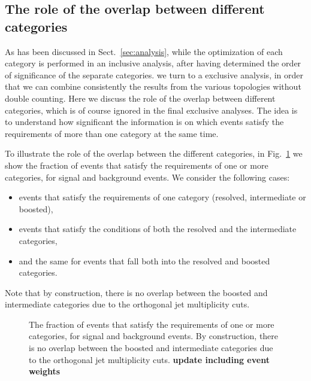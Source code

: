   \subsection{The role of the overlap between different categories}
\label{sec:overlap}

As has been discussed in Sect.~\ref{sec:analysis}, while the optimization of each
category is performed in an inclusive analysis, after having determined the order
of significance of the separate categories. we turn to a exclusive analysis,
in order that
we can combine consistently the results from the various topologies without double
counting.
%
Here we discuss the role of the overlap
between  different categories, which is of course ignored in the final exclusive
analyses.
%
The idea is to understand how significant the information is on which events satisfy the requirements
of more than one category at the same time.

To illustrate the role of the overlap between the different categories, in
Fig.~\ref{fig:categorisationHisto} we show the fraction of events that satisfy the requirements
of one or more categories, for signal and background events.
%
We consider the following cases:
\begin{itemize}
\item events that satisfy the requirements of one category (resolved,
  intermediate or boosted),
\item events that satisfy the conditions of both the resolved and the intermediate categories,
\item and the same for events that fall both
  into the resolved and boosted categories.
\end{itemize}
 Note that by construction, there is no overlap between the boosted
  and intermediate categories due to the
 orthogonal jet multiplicity cuts.

\begin{figure}[t]
\begin{center}
\caption{\small The fraction of events that satisfy the requirements
  of one or more categories, for signal and background events.
  By construction, there is no overlap between the boosted
  and intermediate categories due to the
   orthogonal jet multiplicity cuts. {\bf update including event weights}
}
\label{fig:categorisationHisto}
\end{center}
\end{figure}

